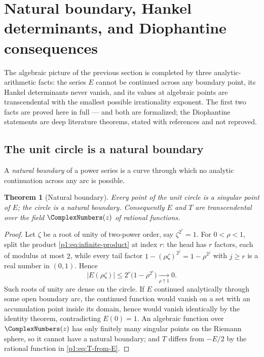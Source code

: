 \documentclass[11pt,oneside]{article}
\numberwithin{equation}{section}
\newtheorem{theorem}{Theorem}[section]
\theoremstyle{definition}
\theoremstyle{remark}
\begin{document}
\section[Natural boundary and Hankel rigidity]{Natural boundary, Hankel determinants, and Diophantine consequences}
\label{p1:sec:boundary-hankel}

The algebraic picture of the previous section is completed by three
analytic-arithmetic facts: the series \(E\) cannot be continued across any
boundary point, its Hankel determinants never vanish, and its values at
algebraic points are transcendental with the smallest possible irrationality
exponent.  The first two facts are proved here in full --- and both are
formalized; the Diophantine statements are deep literature theorems,
stated with references and not reproved.

\subsection{The unit circle is a natural boundary}

A \emph{natural boundary} of a power series is a curve through which no
analytic continuation across any arc is possible.

\begin{theorem}[Natural boundary]
\label{p1:thm:natural-boundary}
Every point of the unit circle is a singular point of \(E\); the circle is a
natural boundary.  Consequently \(E\) and \(T\) are transcendental over the
field \(\ComplexNumbers(z)\) of rational functions.
\end{theorem}

\begin{proof}
Let \(\zeta\) be a root of unity of two-power order, say \(\zeta^{2^r}=1\).
For \(0<\rho<1\), split the product \eqref{p1:eq:infinite-product} at index
\(r\): the head has \(r\) factors, each of modulus at most \(2\), while every
tail factor \(1-(\rho\zeta)^{2^j}=1-\rho^{2^j}\) with \(j\ge r\) is a real
number in \((0,1)\).  Hence
\[
 |E(\rho\zeta)|\le2^r\bigl(1-\rho^{2^r}\bigr)
 \xrightarrow[\rho\uparrow1]{}0.
\]
Such roots of unity are dense on the circle.  If \(E\) continued
analytically through some open boundary arc, the continued function would
vanish on a set with an accumulation point inside its domain, hence would
vanish identically by the identity theorem, contradicting \(E(0)=1\).  An
algebraic function over \(\ComplexNumbers(z)\) has only finitely many singular points on
the Riemann sphere, so it cannot have a natural boundary; and \(T\) differs
from \(-E/2\) by the rational function in \eqref{p1:eq:T-from-E}.
\end{proof}
\end{document}
